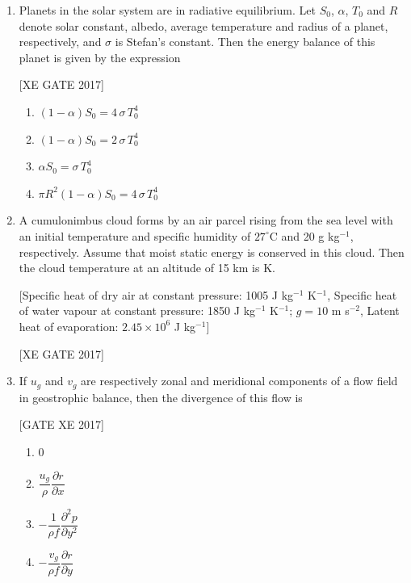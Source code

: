 \documentclass[journal,12pt,onecolumn]{IEEEtran}
\theoremstyle{remark}
\begin{document}
\begin{enumerate}
\item Planets in the solar system are in radiative equilibrium. Let $S_0$, $\alpha$, $T_0$ and $R$ denote solar constant, albedo, average temperature and radius of a planet, respectively, and $\sigma$ is Stefan’s constant. Then the energy balance of this planet is given by the expression

\hfill [XE GATE 2017]

\begin{multicols}{2}
\begin{enumerate}
\item $(1-\alpha)S_0=4\,\sigma\,T_0^{4}$
\item $(1-\alpha)S_0=2\,\sigma\,T_0^{4}$
\item $\alpha S_0=\sigma\,T_0^{4}$
\item $\pi R^{2}(1-\alpha)S_0=4\,\sigma\,T_0^{4}$
\end{enumerate}
\end{multicols}


\item A cumulonimbus cloud forms by an air parcel rising from the sea level with an initial temperature and specific humidity of $27^\circ$C and 20 g kg$^{-1}$, respectively. Assume that moist static energy is conserved in this cloud. Then the cloud temperature at an altitude of 15 km is \underline{\hspace{2cm}} K.

[Specific heat of dry air at constant pressure: 1005 J kg$^{-1}$ K$^{-1}$, Specific heat of water vapour at constant pressure: 1850 J kg$^{-1}$ K$^{-1}$; $g=10$ m s$^{-2}$, Latent heat of evaporation: $2.45\times10^{6}$ J kg$^{-1}$]

\hfill [XE GATE 2017]

\item If $u_g$ and $v_g$ are respectively zonal and meridional components of a flow field in geostrophic balance, then the divergence of this flow is  

\hfill [GATE XE 2017] 

\begin{multicols}{2}
\begin{enumerate}
\item $0$  
\item $\dfrac{u_g}{\rho} \dfrac{\partial r}{\partial x}$  
\item $-\dfrac{1}{\rho f} \dfrac{\partial^2 p}{\partial y^2}$  
\item $-\dfrac{v_g}{\rho f} \dfrac{\partial r}{\partial y}$  
\end{enumerate}
\end{multicols}


\end{enumerate}
\end{document}
